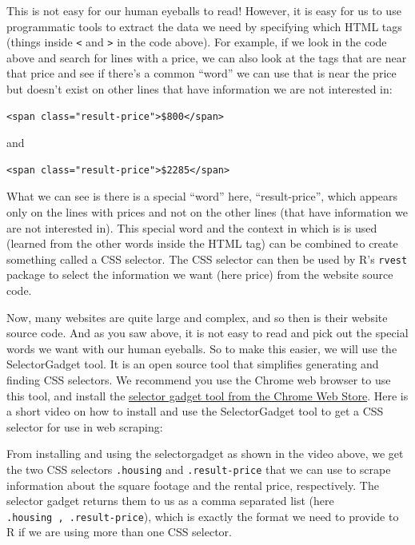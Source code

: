 \documentclass[
]{article}
\begin{document}
This is not easy for our human eyeballs to read! However, it is easy for
us to use programmatic tools to extract the data we need by specifying
which HTML tags (things inside \texttt{\textless{}} and
\texttt{\textgreater{}} in the code above). For example, if we look in
the code above and search for lines with a price, we can also look at
the tags that are near that price and see if there's a common ``word''
we can use that is near the price but doesn't exist on other lines that
have information we are not interested in:

\begin{verbatim}
<span class="result-price">$800</span>
\end{verbatim}

and

\begin{verbatim}
<span class="result-price">$2285</span>
\end{verbatim}

What we can see is there is a special ``word'' here, ``result-price'',
which appears only on the lines with prices and not on the other lines
(that have information we are not interested in). This special word and
the context in which is is used (learned from the other words inside the
HTML tag) can be combined to create something called a CSS selector. The
CSS selector can then be used by R's \texttt{rvest} package to select
the information we want (here price) from the website source code.

Now, many websites are quite large and complex, and so then is their
website source code. And as you saw above, it is not easy to read and
pick out the special words we want with our human eyeballs. So to make
this easier, we will use the SelectorGadget tool. It is an open source
tool that simplifies generating and finding CSS selectors. We recommend
you use the Chrome web browser to use this tool, and install the
\href{https://chrome.google.com/webstore/detail/selectorgadget/mhjhnkcfbdhnjickkkdbjoemdmbfginb}{selector
gadget tool from the Chrome Web Store}. Here is a short video on how to
install and use the SelectorGadget tool to get a CSS selector for use in
web scraping:

From installing and using the selectorgadget as shown in the video
above, we get the two CSS selectors \texttt{.housing} and
\texttt{.result-price} that we can use to scrape information about the
square footage and the rental price, respectively. The selector gadget
returns them to us as a comma separated list (here
\texttt{.housing\ ,\ .result-price}), which is exactly the format we
need to provide to R if we are using more than one CSS selector.
\end{document}
